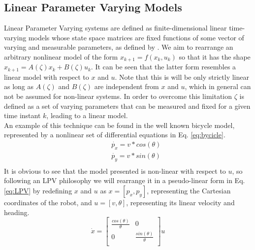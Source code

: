 \documentclass[a4paper,fleqn]{cas-sc}
\begin{document}
\subsection{Linear Parameter Varying Models}
\label{sec:LPV_Mod}

Linear Parameter Varying systems are defined as finite-dimensional linear time-varying models whose state space matrices are fixed functions of some vector of varying and measurable parameters, as defined by \cite{sename2013robust}. We aim to rearrange an arbitrary nonlinear model of the form $x_{k+1} = f(x_k,u_k)$ so that it has the shape $x_{k+1} = A(\zeta)x_k + B(\zeta)u_k$. It can be seen that the latter form resembles a linear model with respect to $x$ and $u$. Note that this is will be only strictly linear as long as $A(\zeta)$ and $B(\zeta)$ are independent from $x$ and $u$, which in general can not be assumed for non-linear systems. In order to overcome this limitation $\zeta$ is defined as a set of varying parameters that can be measured and fixed for a given time instant $k$, leading to a linear model.\\ 

An example of this technique can be found in the well known bicycle model, represented by a nonlinear set of differential equations in Eq. \eqref{eq:bycicle}.\\ 
    \begin{equation}
        \begin{aligned}
            \label{eq:bycicle}
            &&& \dot{p_x} = v * cos(\theta) \\
            &&& \dot{p_y} = v * sin(\theta) \\
        \end{aligned}
    \end{equation}
It is obvious to see that the model presented is non-linear with respect to $u$, so following an LPV philosophy we will rearrange it in a pseudo-linear form in Eq. \eqref{eq:LPV} by redefining $x$ and $u$ as $x = [p_x,p_y]$, representing the Cartesian coordinates of the robot, and $u = [v,\theta]$, representing its linear velocity and heading.\\ 
\begin{equation}
\label{eq:LPV}
    \dot{x} = \left[\begin{array}{cc}
                \frac{cos(\theta)}{\theta} & 0 \\
                0 & \frac{sin(\theta)}{\theta} \\
            \end{array}\right] u 
\end{equation}
\end{document}
